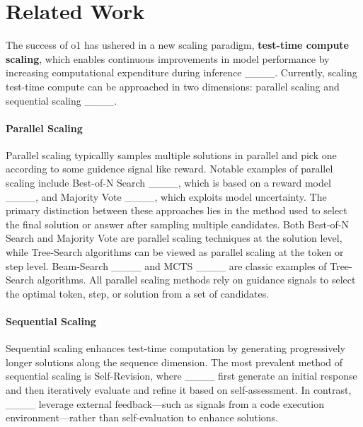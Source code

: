 \section{Related Work}
The success of o1 has ushered in a new scaling paradigm, \textbf{test-time compute scaling}, which enables continuous improvements in model performance by increasing computational expenditure during inference ____. Currently, scaling test-time compute can be approached in two dimensions: parallel scaling and sequential scaling ____. 
\paragraph{Parallel Scaling}
Parallel scaling typicallly samples multiple solutions in parallel and pick one according to some guidence signal like reward. Notable examples of parallel scaling include Best-of-N Search ____, which is based on a reward model ____, and Majority Vote ____, which exploits model uncertainty. The primary distinction between these approaches lies in the method used to select the final solution or answer after sampling multiple candidates. Both Best-of-N Search and Majority Vote are parallel scaling techniques at the solution level, while Tree-Search algorithms can be viewed as parallel scaling at the token or step level. Beam-Search ____ and MCTS ____ are classic examples of Tree-Search algorithms. All parallel scaling methods rely on guidance signals to select the optimal token, step, or solution from a set of candidates. 


\paragraph{Sequential Scaling}
Sequential scaling enhances test-time computation by generating progressively longer solutions along the sequence dimension. The most prevalent method of sequential scaling is Self-Revision, where ____ first generate an initial response and then iteratively evaluate and refine it based on self-assessment. In contrast, ____ leverage external feedback—such as signals from a code execution environment—rather than self-evaluation to enhance solutions.

